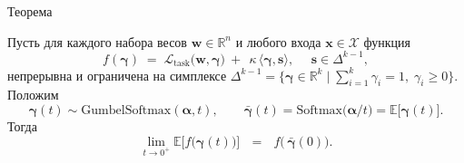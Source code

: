 \documentclass{beamer}
\begin{document}

\begin{frame}{Теорема} %
\small

\begin{theorem}[Фирсов, 2025]
Пусть для каждого набора весов $\boldsymbol w\in\mathbb R^n$
и любого входа $\boldsymbol x\in\mathcal X$ функция
$$f(\boldsymbol\gamma)
   \;=\;
   \mathcal L_{\mathrm{task}}\!\bigl(\boldsymbol w,\boldsymbol\gamma\bigr)
    \ + \ \  \kappa\,\langle\boldsymbol\gamma,\boldsymbol s\rangle,
    \ \ \ \ \ \ \boldsymbol s\in\Delta^{k-1},$$
непрерывна и ограничена на симплексе
$\Delta^{k-1}
  =\bigl\{\boldsymbol\gamma\in\mathbb R^{k}\mid\sum_{i=1}^{k}\gamma_i=1,\;
          \gamma_i\ge 0\bigr\}$.
Положим
$$\boldsymbol\gamma(t)\sim\mathrm{GumbelSoftmax}(\boldsymbol\alpha,t),
   \qquad
   \boldsymbol{\bar\gamma}(t)=\mathrm{Softmax}\!\bigl(\boldsymbol\alpha/t\bigr)
               =\mathbb E\bigl[\boldsymbol\gamma(t)\bigr].$$
Тогда
$$\lim_{t\to 0^{+}}
       \mathbb E\bigl[f\bigl(\boldsymbol\gamma(t)\bigr)\bigr]
   \ \ \ = \ \ \ 
   f\!\bigl(\,\boldsymbol{\bar\gamma}(0)\bigr).$$
\end{theorem}

\end{frame}
\end{document}
